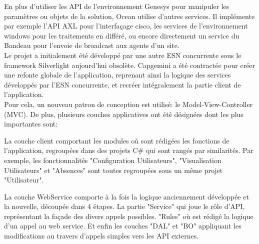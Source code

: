 \documentclass{rapport}
\begin{document}
En plus d'utiliser les API de l'environnement Genesys pour manipuler les paramètres ou objets de la solution, Ocean utilise d'autres services. Il implémente par exemple l'API AXL pour l'interfaçage cisco, les services de l'environnement windows pour les traitements en différé, ou encore directement un service du Bandeau pour l'envoie de broadcast aux agents d'un site.\\

Le projet a initialement été développé par une autre ESN concurrente sous le framework Silverlight aujourd'hui obsolète. Capgemini a été contractée pour créer une refonte globale de l'application, reprenant ainsi la logique des services développés par l'ESN concurrente, et recréer intégralement la partie client de l'application.\\
Pour cela, un nouveau patron de conception est utilisé: le Model-View-Controller (MVC). De plus, plusieurs couches applicatives ont été désignées dont les plus importantes sont:\\

\begin{minipage}{0.35\textwidth}
\end{minipage}
\begin{minipage}{0.55\textwidth}
La couche client comportant les modules où sont rédigées les fonctions de l'application, regroupées dans des projets C\# qui sont rangés par similarités. Par exemple, les fonctionnalités "Configuration Utilisateurs", "Visualisation Utilisateurs" et "Absences" sont toutes regroupées sous un même projet "Utilisateur".
\end{minipage}
\vspace{5mm} %

\begin{minipage}{0.35\textwidth}
\end{minipage}
\begin{minipage}{0.55\textwidth}
La couche WebService comporte à la fois la logique anciennement développée et la nouvelle, découpée dans 4 étapes. La partie "Service" qui joue le rôle d'API, représentant la façade des divers appels possibles. "Rules" où est rédigé la logique d'un appel au web service. Et enfin les couches "DAL" et "BO" appliquant les modifications au travers d'appels simples vers les API externes.
\end{minipage}
\vspace{5mm} %
\\
\end{document}
